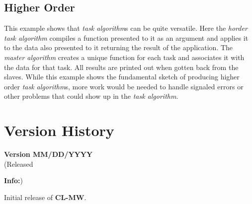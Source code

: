 \documentclass[titlepage,12pt]{book}
\newcommand{\xsmall}{\latexhtml{\small}{}}
\newcommand{\xnormalsize}{\latexhtml{\normalsize}{}}
\newcommand{\clmw}{\xsmall\textbf{CL-MW}\xnormalsize\xspace}
\newcommand{\ma}{\textit{master algorithm}\xspace}
\newcommand{\ta}{\textit{task algorithm}\xspace}
\newcommand{\tas}{\textit{task algorithm}s\xspace}
\newcommand{\bold}[1]{\textbf{#1}\xspace}
\newenvironment{verhist}[2]
	{\textbf{Version #1}\\\indent\xsmall(Released #2)\xnormalsize
	 \begin{itemize}}
	{\end{itemize}}
\newcommand{\info}{\item \bold{Info:}\xspace}
\begin{document}
\section{Higher Order}
This example shows that \tas can be quite versatile. Here the
\textit{horder} \ta compiles a function presented to it as an argument
and applies it to the data also presented to it returning the result
of the application. The \ma creates a unique function for each task
and associates it with the data for that task. All results are printed
out when gotten back from the slaves. While this example shows the
fundamental sketch of producing higher order \tas, more work would
be needed to handle signaled errors or other problems that could show
up in the \ta.

\chapter{\label{version-history}Version History}

\begin{verhist}{0.1}{MM/DD/YYYY}
\info Initial release of \clmw.
\end{verhist}

\backmatter
\end{document}
